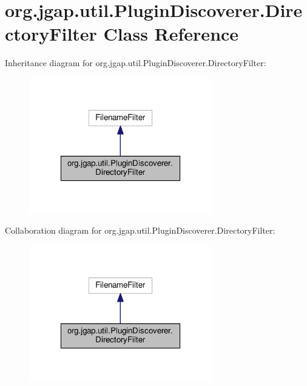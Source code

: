 \hypertarget{classorg_1_1jgap_1_1util_1_1_plugin_discoverer_1_1_directory_filter}{\section{org.\-jgap.\-util.\-Plugin\-Discoverer.\-Directory\-Filter Class Reference}
\label{classorg_1_1jgap_1_1util_1_1_plugin_discoverer_1_1_directory_filter}
}


Inheritance diagram for org.\-jgap.\-util.\-Plugin\-Discoverer.\-Directory\-Filter\-:
\nopagebreak
\begin{figure}[H]
\begin{center}
\leavevmode
\includegraphics[width=226pt]{classorg_1_1jgap_1_1util_1_1_plugin_discoverer_1_1_directory_filter__inherit__graph}
\end{center}
\end{figure}


Collaboration diagram for org.\-jgap.\-util.\-Plugin\-Discoverer.\-Directory\-Filter\-:
\nopagebreak
\begin{figure}[H]
\begin{center}
\leavevmode
\includegraphics[width=226pt]{classorg_1_1jgap_1_1util_1_1_plugin_discoverer_1_1_directory_filter__coll__graph}
\end{center}
\end{figure}
